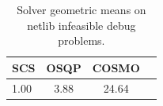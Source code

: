 \begin{table}
\centering
\caption{Solver geometric means on netlib infeasible debug problems.}
\label{t-netlib infeasible debug-geom_mean}
\begin{tabular}{lccc}
\toprule
 SCS &  OSQP &  COSMO \\
\midrule
1.00 &  3.88 &  24.64 \\
\bottomrule
\end{tabular}
\end{table}
